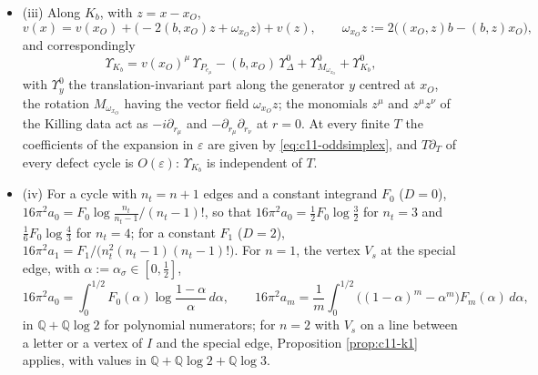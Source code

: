 \begin{theorem}
\begin{itemize}
\item (iii) Along $K_b$, with $z=x-x_O$,
\[
v(x)=v(x_O)+\big(-2(b,x_O)z+\omega_{x_O}z\big)+v(z),\qquad \omega_{x_O}z:=2\big((x_O,z)b-(b,z)x_O\big),
\]
and correspondingly
\begin{equation}
\Upsilon_{K_b}=v(x_O)^\mu\,\Upsilon_{P_{e_\mu}}-(b,x_O)\,\Upsilon^0_\Delta+\Upsilon^0_{M_{\omega_{x_O}}}+\Upsilon^0_{K_b},
\label{eq:c11-Kdec}
\end{equation}
with $\Upsilon^0_y$ the translation-invariant part along the generator $y$ centred at $x_O$, the rotation $M_{\omega_{x_O}}$ having the vector field $\omega_{x_O}z$; the monomials $z^\mu$ and $z^\mu z^\nu$ of the Killing data act as $-i\partial_{r_\mu}$ and $-\partial_{r_\mu}\partial_{r_\nu}$ at $r=0$. At every finite $T$ the coefficients of the expansion in $\varepsilon$ are given by \eqref{eq:c11-oddsimplex}, and $T\partial_T$ of every defect cycle is $O(\varepsilon)$: $\Upsilon_{K_b}$ is independent of $T$.
\item (iv) For a cycle with $n_t=n+1$ edges and a constant integrand $F_0$ ($D=0$), $16\pi^2a_0=F_0\log\frac{n_t}{n_t-1}\big/(n_t-1)!$, so that $16\pi^2a_0=\tfrac12F_0\log\tfrac32$ for $n_t=3$ and $\tfrac16F_0\log\tfrac43$ for $n_t=4$; for a constant $F_1$ ($D=2$), $16\pi^2a_1=F_1\big/\big(n_t^2(n_t-1)(n_t-1)!\big)$. For $n=1$, the vertex $V_s$ at the special edge, with $\alpha:=\alpha_\sigma\in[0,\tfrac12]$,
\[
16\pi^2a_0=\int_0^{1/2}F_0(\alpha)\log\frac{1-\alpha}\alpha\,d\alpha,\qquad 16\pi^2a_m=\frac1m\int_0^{1/2}\big((1-\alpha)^m-\alpha^m\big)F_m(\alpha)\,d\alpha,
\]
in $\mathbb Q+\mathbb Q\log2$ for polynomial numerators; for $n=2$ with $V_s$ on a line between a letter or a vertex of $I$ and the special edge, Proposition \ref{prop:c11-k1} applies, with values in $\mathbb Q+\mathbb Q\log2+\mathbb Q\log3$.
\end{itemize}
\end{theorem}

